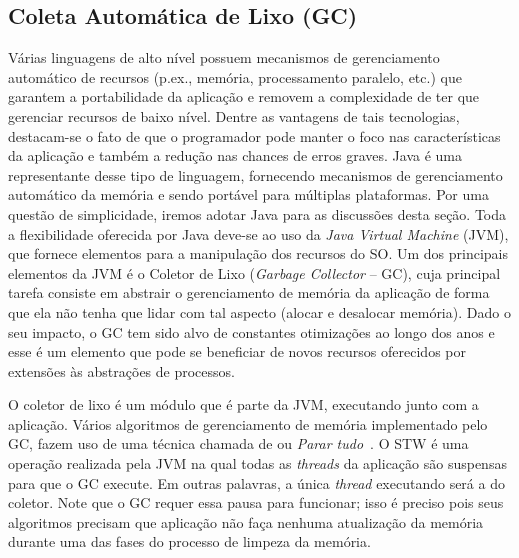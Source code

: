 \subsection{Coleta Automática de Lixo (GC)}
\label{sec:gc}

Várias linguagens de alto nível possuem mecanismos de gerenciamento automático de recursos
(p.ex., memória, processamento paralelo, etc.) que garantem a portabilidade
da aplicação e removem a complexidade de ter que gerenciar recursos de baixo
nível. Dentre as vantagens de tais tecnologias, destacam-se o fato de que o
programador pode manter o foco nas características da aplicação e também a redução
nas chances de erros graves. Java é uma representante desse tipo de
linguagem, fornecendo mecanismos de gerenciamento automático da memória e sendo
portável para múltiplas plataformas. Por uma questão de simplicidade, iremos
adotar Java para as discussões desta seção. Toda a flexibilidade
oferecida por Java deve-se ao uso da \emph{Java Virtual Machine} (JVM), que
fornece elementos para a manipulação dos recursos do SO. Um dos principais
elementos da JVM é o Coletor de Lixo (\emph{Garbage Collector} -- GC), cuja principal tarefa
consiste em abstrair o gerenciamento de memória da aplicação de forma que ela
não tenha que lidar com tal aspecto (alocar e desalocar memória). Dado o seu impacto, o
GC tem sido alvo de constantes otimizações ao longo dos anos e esse é um
elemento que pode se beneficiar de novos recursos oferecidos por extensões às
abstrações de processos.

O coletor de lixo é um módulo que é parte da JVM, executando junto com a
aplicação.  Vários algoritmos de gerenciamento de memória implementado pelo GC,
fazem uso de uma técnica chamada de  ou
\emph{Parar tudo}~\citep{pauseless}. O STW é uma operação realizada pela JVM
na qual todas as \emph{threads} da aplicação são suspensas para que o GC
execute.  Em outras palavras, a única \emph{thread} executando será a do
coletor. Note que o GC requer essa pausa para funcionar; isso é preciso pois
seus algoritmos precisam que aplicação não faça nenhuma atualização da memória
durante uma das fases do processo de limpeza da memória.

